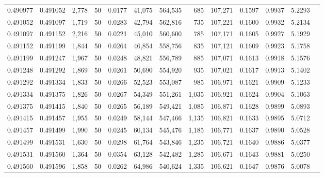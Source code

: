 \begin{tabular}{rrrrrrrrrrrrr}
0.490977 & 0.491052 & 2,778 &  50 &                                     0.0177 &  41,075 & 564,535 &     685 & 107,271 & 0.1597 & 0.9937 & 5.2293 \\
0.491052 & 0.491097 & 1,719 &  50 &                                     0.0283 &  42,794 & 562,816 &     735 & 107,221 & 0.1600 & 0.9932 & 5.2134 \\
0.491097 & 0.491152 & 2,216 &  50 &                                     0.0221 &  45,010 & 560,600 &     785 & 107,171 & 0.1605 & 0.9927 & 5.1929 \\
0.491152 & 0.491199 & 1,844 &  50 &                                     0.0264 &  46,854 & 558,756 &     835 & 107,121 & 0.1609 & 0.9923 & 5.1758 \\
0.491199 & 0.491247 & 1,967 &  50 &                                     0.0248 &  48,821 & 556,789 &     885 & 107,071 & 0.1613 & 0.9918 & 5.1576 \\
0.491248 & 0.491292 & 1,869 &  50 &                                     0.0261 &  50,690 & 554,920 &     935 & 107,021 & 0.1617 & 0.9913 & 5.1402 \\
0.491292 & 0.491334 & 1,833 &  50 &                                     0.0266 &  52,523 & 553,087 &     985 & 106,971 & 0.1621 & 0.9909 & 5.1233 \\
0.491334 & 0.491375 & 1,826 &  50 &                                     0.0267 &  54,349 & 551,261 &   1,035 & 106,921 & 0.1624 & 0.9904 & 5.1063 \\
0.491375 & 0.491415 & 1,840 &  50 &                                     0.0265 &  56,189 & 549,421 &   1,085 & 106,871 & 0.1628 & 0.9899 & 5.0893 \\
0.491415 & 0.491457 & 1,955 &  50 &                                     0.0249 &  58,144 & 547,466 &   1,135 & 106,821 & 0.1633 & 0.9895 & 5.0712 \\
0.491457 & 0.491499 & 1,990 &  50 &                                     0.0245 &  60,134 & 545,476 &   1,185 & 106,771 & 0.1637 & 0.9890 & 5.0528 \\
0.491499 & 0.491531 & 1,630 &  50 &                                     0.0298 &  61,764 & 543,846 &   1,235 & 106,721 & 0.1640 & 0.9886 & 5.0377 \\
0.491531 & 0.491560 & 1,364 &  50 &                                     0.0354 &  63,128 & 542,482 &   1,285 & 106,671 & 0.1643 & 0.9881 & 5.0250 \\
0.491560 & 0.491596 & 1,858 &  50 &                                     0.0262 &  64,986 & 540,624 &   1,335 & 106,621 & 0.1647 & 0.9876 & 5.0078 \\

\end{tabular}
